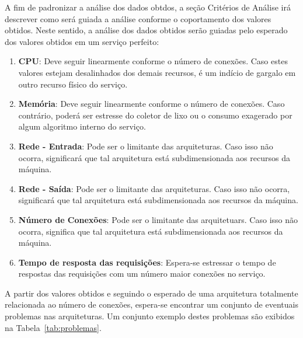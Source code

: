 A fim de padronizar a análise dos dados obtdos, a seção Critérios de Análise irá descrever como será guiada a análise conforme o coportamento dos valores obtidos.
%
Neste sentido, a análise dos dados obtidos serão guiadas pelo esperado dos valores obtidos em um serviço perfeito:

\begin{enumerate}
  \item \textbf{CPU}: Deve seguir linearmente conforme o número de conexões. Caso estes valores estejam desalinhados dos demais recursos, é um indício de gargalo em outro recurso físico do serviço.
  \item \textbf{Memória}: Deve seguir linearmente conforme o número de conexões. Caso contrário, poderá ser estresse do coletor de lixo ou o consumo exagerado por algum algoritmo interno do serviço.
  \item \textbf{Rede - Entrada}: Pode ser o limitante das arquiteturas. Caso isso não ocorra, significará que tal arquitetura está subdimensionada aos recursos da máquina.
  \item \textbf{Rede - Saída}: Pode ser o limitante das arquiteturas. Caso isso não ocorra, significará que tal arquitetura está subdimensionada aos recursos da máquina.
  \item \textbf{Número de Conexões}: Pode ser o limitante das arquitetuars. Caso isso não ocorra, significa que tal arquitetura está subdimensionada aos recursos da máquina.
  \item \textbf{Tempo de resposta das requisições}: Espera-se estressar o tempo de respostas das requisições com um número maior conexões no serviço.
\end{enumerate}

A partir dos valores obtidos e seguindo o esperado de uma arquitetura totalmente relacionada ao número de conexões, espera-se encontrar um conjunto de eventuais problemas nas arquiteturas.
%
Um conjunto exemplo destes problemas são exibidos na Tabela~\ref{tab:problemas}.

